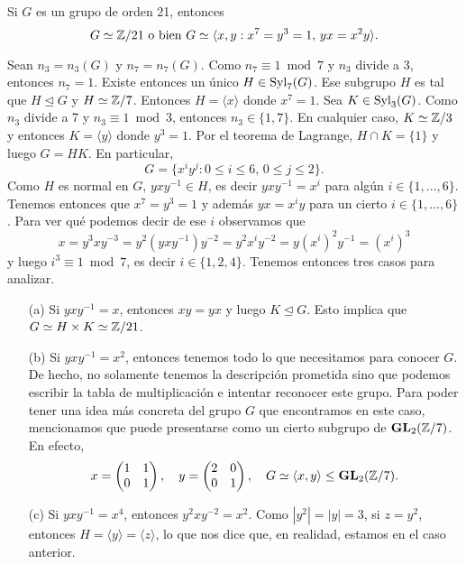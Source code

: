 \begin{example}
Si $G$ es un grupo de orden 	21, entonces 
\[
G\simeq\mathbb{Z}/21\text{ o bien }G\simeq\langle x,y:x^7=y^3=1,\,yx=x^2y\rangle.
\] 

Sean $n_3=n_3(G)$ y $n_7=n_7(G)$. Como $n_7\equiv1\bmod 7$ y $n_3$ divide a $3$, entonces $n_7=1$. Existe entonces
un único $H\in\mathrm{Syl}_7(G)$. Ese subgrupo $H$ es tal que $H\unlhd G$ y $H\simeq\mathbb{Z}/7$. Entonces $H=\langle x\rangle$ donde $x^7=1$. 
Sea $K\in\mathrm{Syl}_3(G)$. Como $n_3$ divide a 7 y $n_3\equiv1\bmod 3$, entonces $n_3\in\{1,7\}$. En cualquier caso, $K\simeq\mathbb{Z}/3$ y 
entonces $K=\langle y\rangle$ donde $y^3=1$. Por el teorema de Lagrange, $H\cap K=\{1\}$ y luego $G=HK$. En particular,
\[
G=\{x^iy^j:0\leq i\leq 6,\,0\leq j\leq 2\}.
\]
Como $H$ es normal en $G$, $yxy^{-1}\in H$, es decir $yxy^{-1}=x^i$ para algún $i\in\{1,\dots,6\}$. Tenemos entonces
que $x^7=y^3=1$ y además $yx=x^iy$ para un cierto $i\in\{1,\dots,6\}$. Para ver qué podemos decir de ese $i$ observamos que
\[
x=y^3xy^{-3}=y^2(yxy^{-1})y^{-2}=y^2x^iy^{-2}=y(x^i)^2y^{-1}=(x^i)^3
\]
y luego $i^3\equiv 1\bmod 7$, es decir $i\in\{1,2,4\}$.  Tenemos entonces tres casos para analizar.
\begin{enumerate}
	\item[(a)] Si $yxy^{-1}=x$, entonces $xy=yx$ y luego $K\unlhd G$. Esto implica que $G\simeq H\times K\simeq\mathbb{Z}/21$. 
	\item[(b)] Si $yxy^{-1}=x^2$, entonces tenemos todo lo que necesitamos para conocer $G$. De hecho, no solamente tenemos la descripción prometida sino que 
	podemos escribir la tabla de multiplicación e intentar reconocer este grupo. Para poder tener una idea más concreta del grupo $G$ que encontramos en este caso, mencionamos que puede presentarse como un cierto subgrupo de $\mathbf{GL}_2(\mathbb{Z}/7)$. En efecto,  
	\[
	x=\begin{pmatrix}
	1&1\\
	0&1\end{pmatrix},
	\quad	
	y=\begin{pmatrix}
	2&0\\
	0&1\end{pmatrix},
	\quad
	G\simeq\langle x,y\rangle\leq \mathbf{GL}_2(\mathbb{Z}/7).
\]
\item[(c)] Si $yxy^{-1}=x^4$, entonces $y^2xy^{-2}=x^2$. Como $|y^2|=|y|=3$, si $z=y^2$, entonces $H=\langle y\rangle=\langle z\rangle$, lo que nos dice
que, en realidad, estamos en el caso anterior. 
\end{enumerate}
\end{example}


